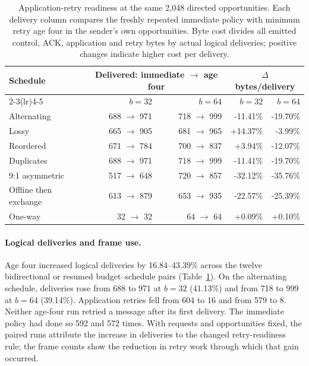 \documentclass[pdflatex]{sn-jnl}
\theoremstyle{thmstyleone}
\theoremstyle{thmstylethree}
\theoremstyle{thmstyletwo}
\begin{document}
\begin{table}[t]
\centering
\small
\setlength{\tabcolsep}{3.5pt}
\begin{tabular}{@{}lrrrr@{}}
\toprule
Schedule & \multicolumn{2}{c}{Delivered: immediate $\to$ age four} & \multicolumn{2}{c}{$\Delta$ bytes/delivery}\\
\cmidrule(lr){2-3}\cmidrule(lr){4-5}
 & $b=32$ & $b=64$ & $b=32$ & $b=64$\\
\midrule
Alternating & 688 $\to$ 971 & 718 $\to$ 999 & -11.41\% & -19.70\%\\
Lossy & 665 $\to$ 905 & 681 $\to$ 965 & +14.37\% & -3.99\%\\
Reordered & 671 $\to$ 784 & 700 $\to$ 837 & +3.94\% & -12.07\%\\
Duplicates & 688 $\to$ 971 & 718 $\to$ 999 & -11.41\% & -19.70\%\\
9:1 asymmetric & 517 $\to$ 648 & 720 $\to$ 857 & -32.12\% & -35.76\%\\
Offline then exchange & 613 $\to$ 879 & 653 $\to$ 935 & -22.57\% & -25.39\%\\
One-way & 32 $\to$ 32 & 64 $\to$ 64 & +0.09\% & +0.10\%\\
\bottomrule
\end{tabular}
\caption{Application-retry readiness at the same 2,048 directed opportunities. Each delivery column compares the freshly repeated immediate policy with minimum retry age four in the sender's own opportunities. Byte cost divides all emitted control, ACK, application and retry bytes by actual logical deliveries; positive changes indicate higher cost per delivery.}
\label{tab:retry-readiness}
\end{table}

\paragraph{Logical deliveries and frame use.}
Age four increased logical deliveries by 16.84--43.39\% across the
twelve bidirectional or resumed budget--schedule pairs
(Table~\ref{tab:retry-readiness}). On the alternating schedule,
deliveries rose from 688 to 971 at $b=32$ (41.13\%) and from 718 to
999 at $b=64$ (39.14\%). Application retries fell from 604 to 16 and
from 579 to 8. Neither age-four run retried a message after its first
delivery. The immediate policy had done so 592 and 572 times. With
requests and opportunities fixed, the paired runs attribute the increase
in deliveries to the changed retry-readiness rule; the frame counts show the
reduction in retry work through which that gain occurred.
\end{document}
